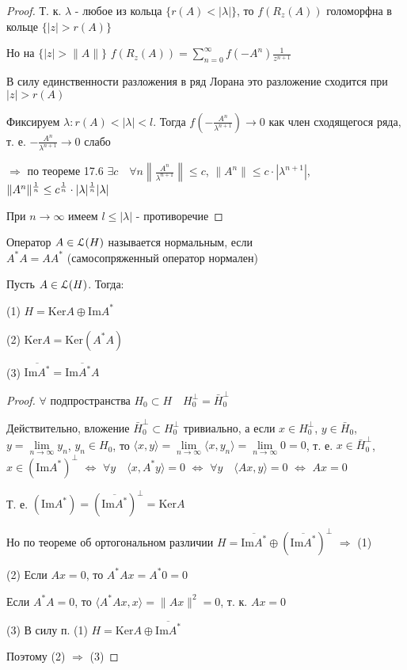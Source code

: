 \documentclass[a4paper,12pt]{report}
\newcommand*{\hm}[1]{#1\nobreak\discretionary{}%
            {\hbox{$\mathsurround=0pt #1$}}{}}
\begin{document}
\begin{proof}
Т. к. $\lambda$ - любое из кольца $\{r(A)<|\lambda|\}$, то $f(R_z(A))$ голоморфна в кольце $\{|z|>r(A)\}$

Но на $\{|z|>\|A\|\}$ $f(R_z(A))=\sum\limits_{n=0}^\infty f(-A^n)\displaystyle\frac1{z^{n+1}}$

В силу единственности разложения в ряд Лорана это разложение сходится при $|z|>r(A)$

Фиксируем $\lambda\colon r(A)<|\lambda|<l$. Тогда $f\left(-\displaystyle\frac{A^n}{\lambda^{n+1}}\right)\to0$ как член сходящегося ряда, т. е. $-\displaystyle\frac{A^n}{\lambda^{n+1}}\to0$ слабо 

$\Rightarrow$ по теореме 17.6 $\exists c\quad\forall n\left\|\displaystyle\frac{A^n}{\lambda^{n+1}}\right\|\le c$, $\|A^n\|\le c\cdot|\lambda^{n+1}|$, $\|A^n\|^\frac1n\le c^\frac1n\hm\cdot|\lambda|^\frac1n|\lambda|$

При $n\to\infty$ имеем $l\le|\lambda|$ - противоречие
\end{proof}
 


\begin{df}
Оператор $A\in\EuScript L(H)$ называется нормальным, если \\$A^*A=AA^*$ (самосопряженный оператор нормален)
\end{df}
 


\begin{lem}
Пусть $A\in\EuScript L(H)$. Тогда:

(1) $H=\mathrm{Ker}A\oplus\mathrm{Im}A^*$

(2) $\mathrm{Ker}A=\mathrm{Ker}(A^*A)$

(3) $\overline{\mathrm{Im}A^*}=\overline{\mathrm{Im}A^*A}$
\end{lem}
\begin{proof}
$\forall$ подпространства $H_0\subset H\quad H_0^\perp=\bar H_0^\perp$

Действительно, вложение $\bar H_0^\perp\subset H_0^\perp$ тривиально, а если $x\in H_0^\perp$, $y\in\bar H_0$, $y=\lim\limits_{n\to\infty} y_n$, $y_n\in H_0$, то $\langle x,y\rangle=\lim\limits_{n\to\infty}\langle x,y_n\rangle=\lim\limits_{n\to\infty}0=0$, т. е. $x\in\bar H_0^\perp$, $x\in(\mathrm{Im}A^*)^\perp$ $\Leftrightarrow$ $\forall y\quad\langle x,A^*y\rangle=0$ $\Leftrightarrow$ $\forall y\quad\langle Ax,y\rangle=0$ $\Leftrightarrow$ $Ax=0$

Т. е. $(\mathrm{Im}A^*)=\left(\overline{\mathrm{Im}A^*}\right)^\perp=\mathrm{Ker}A$

Но по теореме об ортогональном различии $H=\overline{\mathrm{Im}A^*}\oplus\left(\overline{\mathrm{Im}A^*}\right)^\perp$ $\Rightarrow$ (1)

(2) Если $Ax=0$, то $A^*Ax=A^*0=0$

Если $A^*A=0$, то $\langle A^*Ax,x\rangle=\|Ax\|^2=0$, т. к. $Ax=0$

(3) В силу п. (1) $H=\mathrm{Ker}A\oplus\overline{\mathrm{Im}A^*}$

Поэтому (2) $\Rightarrow$ (3)
\end{proof}
 
\end{document}
